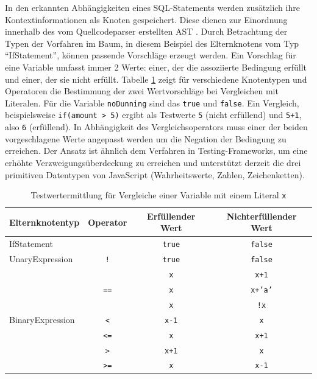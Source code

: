 In den erkannten Abhängigkeiten eines SQL-Statements werden zusätzlich ihre Kontextinformationen als Knoten gespeichert.
Diese dienen zur Einordnung innerhalb des vom Quellcodeparser erstellten AST \cite{Horschig2014}.
Durch Betrachtung der Typen der Vorfahren im Baum, in diesem Beispiel des Elternknotens vom Typ ``IfStatement'', können passende Vorschläge erzeugt werden.
Ein Vorschlag für eine Variable umfasst immer 2 Werte: einer, der die assoziierte Bedingung erfüllt und einer, der sie nicht erfüllt.
Tabelle \ref{tab:tableforgeneratedvalues} zeigt für verschiedene Knotentypen und Operatoren die Bestimmung der zwei Wertvorschläge bei Vergleichen mit Literalen.
Für die Variable \texttt{noDunning} sind das \texttt{true} und \texttt{false}.
Ein Vergleich, beispielsweise \texttt{if(amount > 5)} ergibt als Testwerte \texttt{5} (nicht erfüllend) und \texttt{5+1}, also \texttt{6} (erfüllend).
In Abhängigkeit des Vergleichsoperators muss einer der beiden vorgeschlagene Werte angepasst werden um die Negation der Bedingung zu erreichen.
Der Ansatz ist ähnlich dem Verfahren in Testing-Frameworks, um eine erhöhte Verzweigungsüberdeckung zu erreichen und unterstützt derzeit die drei primitiven Datentypen von JavaScript (Wahrheitswerte, Zahlen, Zeichenketten).

\begin{table}[ht!]
	\centering
	\begin{tabular}{ |l|c|c|c| }
		\hline
		Elternknotentyp 								  & Operator 											& Erfüllender Wert 	& Nichterfüllender Wert\\
		\hline
		\multicolumn{2}{|l|}{IfStatement} 																& \texttt{true} 		& \texttt{false} 	\\
		\hline
		UnaryExpression 								  & \texttt{!} 										& \texttt{true} 		& \texttt{false} 	\\
		\hline
		\multirow{7}{*}{BinaryExpression} & \multirow{3}{*}{\texttt{==}} 	& \texttt{x} 				& \texttt{x+1}		\\ \cline{3-4}
																		  & 															& \texttt{x} 				& \texttt{x+'a'}	\\ \cline{3-4}
																		  & 															& \texttt{x} 				& \texttt{!x}			\\ \cline{2-4}
																		  & \texttt{<} 										& \texttt{x-1} 			& \texttt{x}			\\ \cline{2-4}
																		  & \texttt{<=} 									& \texttt{x} 				& \texttt{x+1}		\\ \cline{2-4}
																		  & \texttt{>} 										& \texttt{x+1} 			& \texttt{x}			\\ \cline{2-4}
																		  & \texttt{>=} 									& \texttt{x} 				& \texttt{x-1}		\\
		\hline
	\end{tabular}
	\caption{Testwertermittlung für Vergleiche einer Variable mit einem Literal \texttt{x}}
	\label{tab:tableforgeneratedvalues}
\end{table}

